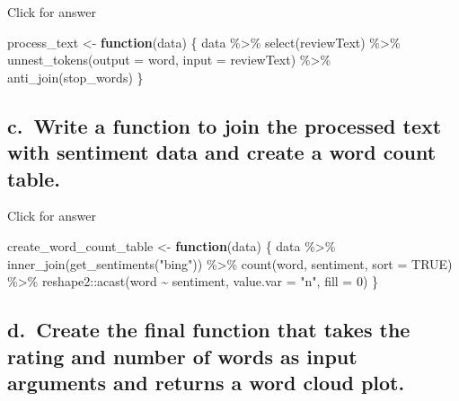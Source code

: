 \documentclass[
]{book}
\newenvironment{Shaded}{\begin{snugshade}}{\end{snugshade}}
\newcommand{\AttributeTok}[1]{\textcolor[rgb]{0.77,0.63,0.00}{#1}}
\newcommand{\ConstantTok}[1]{\textcolor[rgb]{0.00,0.00,0.00}{#1}}
\newcommand{\ControlFlowTok}[1]{\textcolor[rgb]{0.13,0.29,0.53}{\textbf{#1}}}
\newcommand{\DecValTok}[1]{\textcolor[rgb]{0.00,0.00,0.81}{#1}}
\newcommand{\FunctionTok}[1]{\textcolor[rgb]{0.00,0.00,0.00}{#1}}
\newcommand{\NormalTok}[1]{#1}
\newcommand{\OtherTok}[1]{\textcolor[rgb]{0.56,0.35,0.01}{#1}}
\newcommand{\SpecialCharTok}[1]{\textcolor[rgb]{0.00,0.00,0.00}{#1}}
\newcommand{\StringTok}[1]{\textcolor[rgb]{0.31,0.60,0.02}{#1}}
\begin{document}
Click for answer

\begin{Shaded}
\begin{Highlighting}[]
\NormalTok{process\_text }\OtherTok{\textless{}{-}} \ControlFlowTok{function}\NormalTok{(data) \{}
\NormalTok{  data }\SpecialCharTok{\%\textgreater{}\%}
    \FunctionTok{select}\NormalTok{(reviewText) }\SpecialCharTok{\%\textgreater{}\%}
    \FunctionTok{unnest\_tokens}\NormalTok{(}\AttributeTok{output =}\NormalTok{ word, }\AttributeTok{input =}\NormalTok{ reviewText) }\SpecialCharTok{\%\textgreater{}\%}
    \FunctionTok{anti\_join}\NormalTok{(stop\_words)}
\NormalTok{\}}
\end{Highlighting}
\end{Shaded}

\hypertarget{c.-write-a-function-to-join-the-processed-text-with-sentiment-data-and-create-a-word-count-table.}{%
\subsection{c.~Write a function to join the processed text with sentiment data and create a word count table.}\label{c.-write-a-function-to-join-the-processed-text-with-sentiment-data-and-create-a-word-count-table.}}

Click for answer

\begin{Shaded}
\begin{Highlighting}[]
\NormalTok{create\_word\_count\_table }\OtherTok{\textless{}{-}} \ControlFlowTok{function}\NormalTok{(data) \{}
\NormalTok{  data }\SpecialCharTok{\%\textgreater{}\%}
    \FunctionTok{inner\_join}\NormalTok{(}\FunctionTok{get\_sentiments}\NormalTok{(}\StringTok{"bing"}\NormalTok{)) }\SpecialCharTok{\%\textgreater{}\%}
    \FunctionTok{count}\NormalTok{(word, sentiment, }\AttributeTok{sort =} \ConstantTok{TRUE}\NormalTok{) }\SpecialCharTok{\%\textgreater{}\%}
\NormalTok{    reshape2}\SpecialCharTok{::}\FunctionTok{acast}\NormalTok{(word }\SpecialCharTok{\textasciitilde{}}\NormalTok{ sentiment, }\AttributeTok{value.var =} \StringTok{"n"}\NormalTok{, }\AttributeTok{fill =} \DecValTok{0}\NormalTok{)}
\NormalTok{\}}
\end{Highlighting}
\end{Shaded}

\hypertarget{d.-create-the-final-function-that-takes-the-rating-and-number-of-words-as-input-arguments-and-returns-a-word-cloud-plot.}{%
\subsection{d.~Create the final function that takes the rating and number of words as input arguments and returns a word cloud plot.}\label{d.-create-the-final-function-that-takes-the-rating-and-number-of-words-as-input-arguments-and-returns-a-word-cloud-plot.}}
\end{document}
